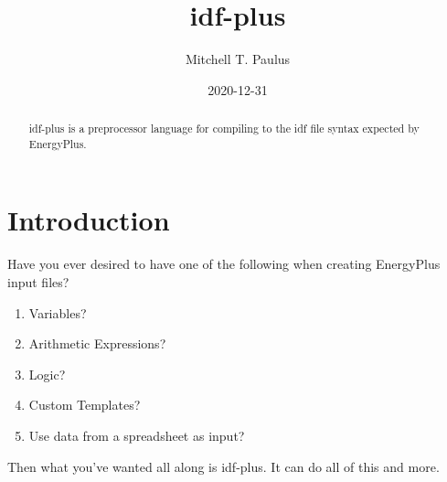\documentclass{article}
\author{Mitchell T. Paulus}
\title{idf-plus}
\date{2020-12-31}
\begin{document}
\maketitle

\begin{abstract}
    idf-plus is a preprocessor language for compiling to the idf file
    syntax expected by EnergyPlus.
\end{abstract}

\section{Introduction}

Have you ever desired to have one of the following when creating
EnergyPlus input files?


\begin{enumerate}
    \item Variables?
    \item Arithmetic Expressions?
    \item Logic?
    \item Custom Templates?
    \item Use data from a spreadsheet as input?
\end{enumerate}

Then what you've wanted all along is idf-plus. It can do all of this and
more.
\end{document}
